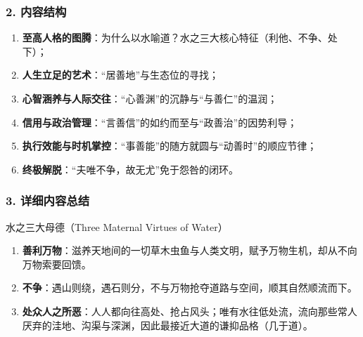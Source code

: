 \subsubsection{2. 内容结构}
\begin{enumerate}
    \item \textbf{至高人格的图腾}：为什么以水喻道？水之三大核心特征（利他、不争、处下）；
    \item \textbf{人生立足的艺术}：“居善地”与生态位的寻找；
    \item \textbf{心智涵养与人际交往}：“心善渊”的沉静与“与善仁”的温润；
    \item \textbf{信用与政治管理}：“言善信”的如约而至与“政善治”的因势利导；
    \item \textbf{执行效能与时机掌控}：“事善能”的随方就圆与“动善时”的顺应节律；
    \item \textbf{终极解脱}：“夫唯不争，故无尤”免于怨咎的闭环。
\end{enumerate}

\subsubsection{3. 详细内容总结}

\begin{ConceptBox}{水之三大母德（Three Maternal Virtues of Water）}
\begin{enumerate}
    \item \textbf{善利万物}：滋养天地间的一切草木虫鱼与人类文明，赋予万物生机，却从不向万物索要回馈。
    \item \textbf{不争}：遇山则绕，遇石则分，不与万物抢夺道路与空间，顺其自然顺流而下。
    \item \textbf{处众人之所恶}：人人都向往高处、抢占风头；唯有水往低处流，流向那些常人厌弃的洼地、沟渠与深渊，因此最接近大道的谦抑品格（几于道）。
\end{enumerate}
\end{ConceptBox}

